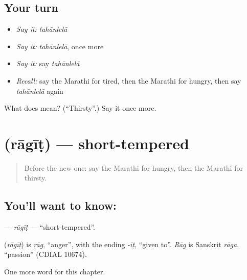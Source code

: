 \subsection*{Your turn}
\begin{itemize}
\raggedright
  \item \emph{Say it:} \emph{tahānlelā}
  \item \emph{Say it:} \emph{tahānlelā}, once more
  \item \emph{Say it:} say \emph{tahānlelā}
  \item \emph{Recall:} say the Marathi for tired, then the Marathi for hungry, then say \emph{tahānlelā} again
\end{itemize}

\begin{tcolorbox}[breakable,colback=teal!4,colframe=teal!35!black,title={Before you move on}]
What does  mean? (\textquotedblleft{}Thirsty\textquotedblright{}.) Say it once more.
\end{tcolorbox}
\section[\texorpdfstring{\mr{रागीट} (rāgīṭ)}{रागीट (rāgīṭ)}]{ (rāgīṭ) — short-tempered}

\label{lesson:MR-C261-ragit}



\begin{quote}
Before the new one: say the Marathi for hungry, then the Marathi for thirsty.
\end{quote}

\subsection*{You'll want to know: }
\textbf{} — \emph{rāgīṭ} — \textquotedblleft{}short-tempered\textquotedblright{}.

\begin{cousinweb}
\textbf{} (\emph{rāgīṭ}) is \emph{rāg}, \textquotedblleft{}anger\textquotedblright{}, with the ending \emph{-īṭ}, \textquotedblleft{}given to\textquotedblright{}. \emph{Rāg} is Sanskrit \emph{rāga}, \textquotedblleft{}passion\textquotedblright{} (CDIAL 10674).
\end{cousinweb}

\begin{grammarlens}[title={What you've built}]
One more word for this chapter.
\end{grammarlens}

